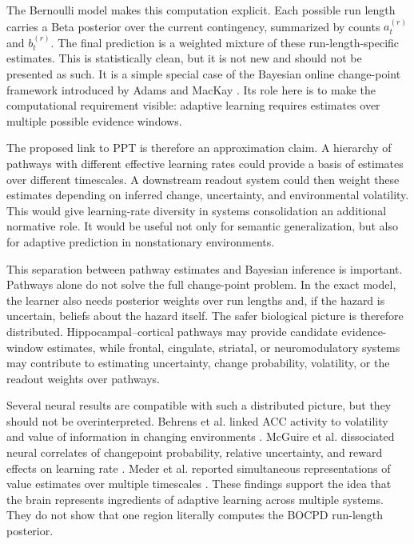 The Bernoulli model makes this computation explicit. Each possible run length carries a Beta posterior over the current contingency, summarized by counts \(a_t^{(r)}\) and \(b_t^{(r)}\). The final prediction is a weighted mixture of these run-length-specific estimates. This is statistically clean, but it is not new and should not be presented as such. It is a simple special case of the Bayesian online change-point framework introduced by Adams and MacKay \citep{Adams2007}. Its role here is to make the computational requirement visible: adaptive learning requires estimates over multiple possible evidence windows.

The proposed link to PPT is therefore an approximation claim. A hierarchy of pathways with different effective learning rates could provide a basis of estimates over different timescales. A downstream readout system could then weight these estimates depending on inferred change, uncertainty, and environmental volatility. This would give learning-rate diversity in systems consolidation an additional normative role. It would be useful not only for semantic generalization, but also for adaptive prediction in nonstationary environments.

This separation between pathway estimates and Bayesian inference is important. Pathways alone do not solve the full change-point problem. In the exact model, the learner also needs posterior weights over run lengths and, if the hazard is uncertain, beliefs about the hazard itself. The safer biological picture is therefore distributed. Hippocampal--cortical pathways may provide candidate evidence-window estimates, while frontal, cingulate, striatal, or neuromodulatory systems may contribute to estimating uncertainty, change probability, volatility, or the readout weights over pathways.

Several neural results are compatible with such a distributed picture, but they should not be overinterpreted. Behrens et al. linked ACC activity to volatility and value of information in changing environments \citep{Behrens2007}. McGuire et al. dissociated neural correlates of changepoint probability, relative uncertainty, and reward effects on learning rate \citep{McGuire2014}. Meder et al. reported simultaneous representations of value estimates over multiple timescales \citep{Meder2017}. These findings support the idea that the brain represents ingredients of adaptive learning across multiple systems. They do not show that one region literally computes the BOCPD run-length posterior.

